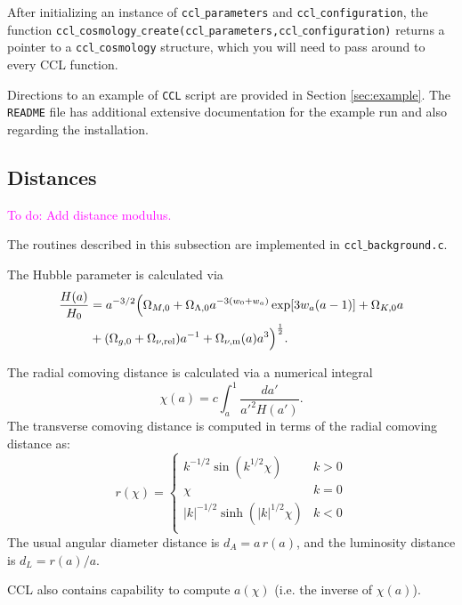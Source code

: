 \documentclass[\docopts]{\docclass}
\newcommand{\todo}[1]{\textcolor{magenta}{To do: #1}}
\begin{document}
After initializing an instance of {\tt ccl$\_$parameters} and {\tt ccl$\_$configuration}, the function {\tt ccl$\_$cosmology$\_$create(ccl$\_$parameters,ccl$\_$configuration)} returns a pointer to a {\tt ccl$\_$cosmology} structure, which you will need to pass around to every CCL function.

Directions to an example of {\tt CCL} script are provided in Section \ref{sec:example}. The {\tt README} file has additional extensive documentation for the example run and also regarding the installation.

\subsection{Distances}
\label{sec:distances}

\todo{Add distance modulus.}

The routines described in this subsection are implemented in {\tt ccl$\_$background.c}.

The Hubble parameter is calculated via
%
\begin{align}\label{eq:Ha}
\frac{H(a)}{H_0} &= a^{-3/2}\Big(\Omega_{M,0}+\Omega_{\Lambda,0} a^{-3(w_0+w_a)}
    \exp[3 w_a (a-1)]+\Omega_{K,0} a \nonumber \\ &+(\Omega_{g,0} + \Omega_{\nu, {\rm rel}}) a^{-1} + \Omega_{\nu, {\rm m}}(a)a^3\Big)^{\frac{1}{2}}.
\end{align}

The radial comoving distance is calculated via a numerical integral
\begin{equation}
 \chi(a)= c \int_a^1 \frac{da'}{a'^2 H(a')}.
\end{equation}
The transverse comoving distance is computed in terms of the radial comoving distance as:
\begin{equation}\label{eq:angdist}
 r(\chi)=\left\{\begin{array}{cc}
                 k^{-1/2}\sin(k^{1/2}\chi) & k>0\\
                 \chi & k=0\\
                 |k|^{-1/2}\sinh(|k|^{1/2}\chi) & k<0\\
                \end{array}\right.
\end{equation}
The usual angular diameter distance is $d_A=a\,r(a)$, and the luminosity distance is
$d_L=r(a)/a$.

CCL also contains capability to compute $a(\chi)$ (i.e. the inverse of $\chi(a)$).
\end{document}
